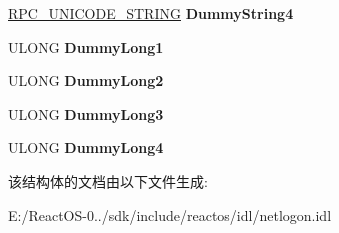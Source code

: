 \begin{DoxyCompactItemize}
\hyperlink{struct___r_p_c___u_n_i_c_o_d_e___s_t_r_i_n_g}{R\+P\+C\+\_\+\+U\+N\+I\+C\+O\+D\+E\+\_\+\+S\+T\+R\+I\+NG} {\bfseries Dummy\+String4}
\item 
\mbox{\label{struct___n_e_t_l_o_g_o_n___d_e_l_t_a___d_e_l_e_t_e___g_r_o_u_p_a49f921b6633d34082139c672b86c47b2}} 
U\+L\+O\+NG {\bfseries Dummy\+Long1}
\item 
\mbox{\label{struct___n_e_t_l_o_g_o_n___d_e_l_t_a___d_e_l_e_t_e___g_r_o_u_p_a2979e3425cc8e23b792bb1b9e3512ad1}} 
U\+L\+O\+NG {\bfseries Dummy\+Long2}
\item 
\mbox{\label{struct___n_e_t_l_o_g_o_n___d_e_l_t_a___d_e_l_e_t_e___g_r_o_u_p_a4e62706d28aa5e73c21325ff9935ac9d}} 
U\+L\+O\+NG {\bfseries Dummy\+Long3}
\item 
\mbox{\label{struct___n_e_t_l_o_g_o_n___d_e_l_t_a___d_e_l_e_t_e___g_r_o_u_p_a1e4b69f1e04da060d40a9d5bc88f9db4}} 
U\+L\+O\+NG {\bfseries Dummy\+Long4}
\end{DoxyCompactItemize}


该结构体的文档由以下文件生成\+:\begin{DoxyCompactItemize}
\item 
E\+:/\+React\+O\+S-\/0../sdk/include/reactos/idl/netlogon.\+idl\end{DoxyCompactItemize}
